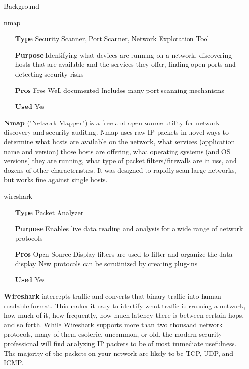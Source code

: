 \begin{chaptercover}{Background}
\begin{solutiondata}{nmap}
\begin{itemize}[labelsep=1cm]
  \item [\textbf{Type}] Security Scanner, Port Scanner, Network Exploration Tool
  \item [\textbf{Purpose}] Identifying what devices are running on a network, discovering hosts that are available and the services they offer, finding open ports and detecting security risks
  \item [\textbf{Pros}] Free \newline Well documented \newline Includes many port scanning mechanisms
  \item [\textbf{Used}] Yes
\end{itemize}
\end{solutiondata}

\textbf{Nmap} \cite{nmap} ("Network Mapper") is a free and open source utility for network discovery and security auditing. Nmap uses raw IP packets in novel ways to determine what hosts are available on the network, what services (application name and version) those hosts are offering, what operating systems (and OS versions) they are running, what type of packet filters/firewalls are in use, and dozens of other characteristics. It was designed to rapidly scan large networks, but works fine against single hosts.

\begin{solutiondata}{wireshark}
\begin{itemize}[labelsep=1cm]
  \item [\textbf{Type}] Packet Analyzer
  \item [\textbf{Purpose}] Enables live data reading and analysis for a wide range of network protocols
  \item [\textbf{Pros}] Open Source \newline Display filters are used to filter and organize the data display \newline New protocols can be scrutinized by creating plug-ins
  \item [\textbf{Used}] Yes
\end{itemize}
\end{solutiondata}

\textbf{Wireshark} \cite{wireshark} intercepts traffic and converts that binary traffic into human-readable format. This makes it easy to identify what traffic is crossing a network, how much of it, how frequently, how much latency there is between certain hops, and so forth. While Wireshark supports more than two thousand network protocols, many of them esoteric, uncommon, or old, the modern security professional will find analyzing IP packets to be of most immediate usefulness. The majority of the packets on your network are likely to be TCP, UDP, and ICMP.


\end{chaptercover}
